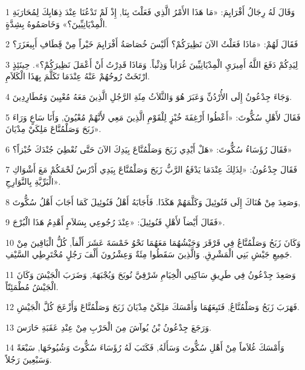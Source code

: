 \par 1 وَقَالَ لَهُ رِجَالُ أَفْرَايِمَ: «مَا هَذَا الأَمْرُ الَّذِي فَعَلْتَ بِنَا, إِذْ لَمْ تَدْعُنَا عِنْدَ ذِهَابِكَ لِمُحَارَبَةِ الْمِدْيَانِيِّينَ؟» وَخَاصَمُوهُ بِشِدَّةٍ.
\par 2 فَقَالَ لَهُمْ: «مَاذَا فَعَلْتُ الآنَ نَظِيرَكُمْ؟ أَلَيْسَ خُصَاصَةُ أَفْرَايِمَ خَيْراً مِنْ قَِطَافِ أَبِيعَزَرَ؟
\par 3 لِيَدِكُمْ دَفَعَ اللَّهُ أَمِيرَيِ الْمِدْيَانِيِّينَ غُرَاباً وَذِئْباً. وَمَاذَا قَدِرْتُ أَنْ أَعْمَلَ نَظِيرَكُمْ؟». حِينَئِذٍ ارْتَخَتْ رُوحُهُمْ عَنْهُ عِنْدَمَا تَكَلَّمَ بِهَذَا الْكَلاَمِ.
\par 4 وَجَاءَ جِدْعُونُ إِلَى الأُرْدُنِّ وَعَبَرَ هُوَ وَالثَّلاَثُ مِئَةِ الرَّجُلِ الَّذِينَ مَعَهُ مُعْيِينَ وَمُطَارِدِينَ.
\par 5 فَقَالَ لأَهْلِ سُكُّوتَ: «أَعْطُوا أَرْغِفَةَ خُبْزٍ لِلْقَوْمِ الَّذِينَ مَعِي لأَنَّهُمْ مُعْيُونَ, وَأَنَا سَاعٍ وَرَاءَ زَبَحَ وَصَلْمُنَّاعَ مَلِكَيْ مِدْيَانَ».
\par 6 فَقَالَ رُؤَسَاءُ سُكُّوتَ: «هَلْ أَيْدِي زَبَحَ وَصَلْمُنَّاعَ بِيَدِكَ الآنَ حَتَّى نُعْطِيَ جُنْدَكَ خُبْزاً؟»
\par 7 فَقَالَ جِدْعُونُ: «لِذَلِكَ عِنْدَمَا يَدْفَعُ الرَّبُّ زَبَحَ وَصَلْمُنَّاعَ بِيَدِي أَدْرُسُ لَحْمَكُمْ مَعَ أَشْوَاكِ الْبَرِّيَّةِ بِالنَّوَارِجِ».
\par 8 وَصَعِدَ مِنْ هُنَاكَ إِلَى فَنُوئِيلَ وَكَلَّمَهُمْ هَكَذَا. فَأَجَابَهُ أَهْلُ فَنُوئِيلَ كَمَا أَجَابَ أَهْلُ سُكُّوتَ,
\par 9 فَقَالَ أَيْضاً لأَهْلِ فَنُوئِيلَ: «عِنْدَ رُجُوعِي بِسَلاَمٍ أَهْدِمُ هَذَا الْبُرْجَ».
\par 10 وَكَانَ زَبَحُ وَصَلْمُنَّاعُ فِي قَرْقَرَ وَجَيْشُهُمَا مَعَهُمَا نَحْوُ خَمْسَةَ عَشَرَ أَلْفاً, كُلُّ الْبَاقِينَ مِنْ جَمِيعِ جَيْشِ بَنِي الْمَشْرِقِ. وَالَّذِينَ سَقَطُوا مِئَةٌ وَعِشْرُونَ أَلْفَ رَجُلٍ مُخْتَرِطِي السَّيْفِ.
\par 11 وَصَعِدَ جِدْعُونُ فِي طَرِيقِ سَاكِنِي الْخِيَامِ شَرْقِيَّ نُوبَحَ وَيُجْبَهَةَ, وَضَرَبَ الْجَيْشَ وَكَانَ الْجَيْشُ مُطْمَئِنّاً.
\par 12 فَهَرَبَ زَبَحُ وَصَلْمُنَّاعُ, فَتَبِعَهُمَا وَأَمْسَكَ مَلِكَيْ مِدْيَانَ زَبَحَ وَصَلْمُنَّاعَ وَأَزْعَجَ كُلَّ الْجَيْشِ.
\par 13 وَرَجَعَ جِدْعُونُ بْنُ يُوآشَ مِنَ الْحَرْبِ مِنْ عِنْدِ عَقَبَةِ حَارَسَ.
\par 14 وَأَمْسَكَ غُلاَماً مِنْ أَهْلِ سُكُّوتَ وَسَأَلَهُ, فَكَتَبَ لَهُ رُؤَسَاءَ سُكُّوتَ وَشُيُوخَهَا, سَبْعَةً وَسَبْعِينَ رَجُلاً.
